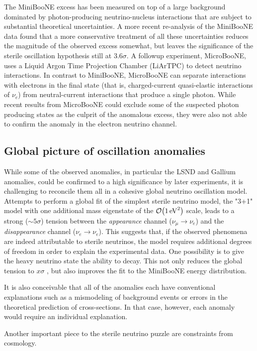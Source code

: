 The MiniBooNE excess has been measured on top of a large background dominated by photon-producing neutrino-nucleus interactions that are subject to substantial theoretical uncertainties. A more recent re-analysis of the MiniBooNE data found that a more conservative treatment of all these uncertainties reduces the magnitude of the observed excess somewhat, but leaves the significance of the sterile oscillation hypothesis still at $3.6\sigma$\cite{Giunti:2019sag}. A followup experiment, MicroBooNE\cite{MicroBooNE:2016pwy}, uses a Liquid Argon Time Projection Chamber (LiArTPC) to detect neutrino interactions. In contrast to MiniBooNE, MicroBooNE can separate interactions with electrons in the final state (that is, charged-current quasi-elastic interactions of $\nu_e$) from neutral-current interactions that produce a single photon. While recent results from MicroBooNE could exclude some of the suspected photon producing states as the culprit of the anomalous excess\cite{MicroBooNE:2021zai}, they were also not able to confirm the anomaly in the electron neutrino channel\cite{MicroBooNE:2022wdf}.

\subsection{Global picture of oscillation anomalies}
While some of the observed anomalies, in particular the LSND and Gallium anomalies, could be confirmed to a high significance by later experiments, it is challenging to reconcile them all in a cohesive global neutrino oscillation model. Attempts to perform a global fit of the simplest sterile neutrino model, the "3+1" model with one additional mass eigenstate of the $\order{\SI{1}{eV^2}}$ scale, leads to a strong ($\sim 5\sigma$) tension between the \emph{appearance} channel ($\nu_\mu \rightarrow \nu_e$) and the \emph{disappearance} channel ($\nu_e \rightarrow \nu_e$)\cite{Dentler_2018}. This suggests that, if the observed phenomena are indeed attributable to sterile neutrinos, the model requires additional degrees of freedom in order to explain the experimental data. One possibility is to give the heavy neutrino state the ability to decay. This not only reduces the global tension to $x\sigma$ ,  but also improves the fit to the MiniBooNE energy distribution.

It is also conceivable that all of the anomalies each have conventional explanations such as a mismodeling of background events or errors in the theoretical prediction of cross-sections. In that case, however, each anomaly would require an individual explanation.

Another important piece to the sterile neutrino puzzle are constraints from cosmology. 
